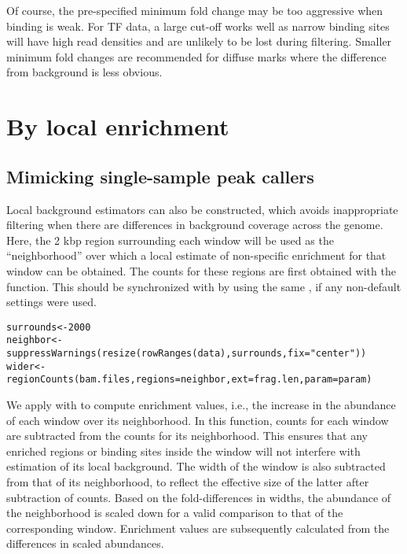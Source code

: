 \documentclass{report}\usepackage[]{graphicx}\usepackage[usenames,dvipsnames]{color}
\newcommand{\hlnum}[1]{\textcolor[rgb]{0.816,0.125,0.439}{#1}}%
\newcommand{\hlstr}[1]{\textcolor[rgb]{0.251,0.627,0.251}{#1}}%
\newcommand{\hlstd}[1]{\textcolor[rgb]{0.251,0.251,0.251}{#1}}%
\newcommand{\hlkwb}[1]{\textcolor[rgb]{0,0,0}{#1}}%
\newcommand{\hlkwc}[1]{\textcolor[rgb]{0.251,0.251,0.251}{#1}}%
\newcommand{\hlkwd}[1]{\textcolor[rgb]{0.878,0.439,0.125}{#1}}%
\newenvironment{knitrout}{}{} %
\begin{document}
Of course, the pre-specified minimum fold change may be too aggressive when binding is weak. 
For TF data, a large cut-off works well as narrow binding sites will have high read densities and are unlikely to be lost during filtering. 
Smaller minimum fold changes are recommended for diffuse marks where the difference from background is less obvious. 

\section{By local enrichment}

\subsection{Mimicking single-sample peak callers}
Local background estimators can also be constructed, which avoids inappropriate filtering when there are differences in background coverage across the genome. 
Here, the 2 kbp region surrounding each window will be used as the ``neighborhood'' over which a local estimate of non-specific enrichment for that window can be obtained. 
The counts for these regions are first obtained with the  function.
This should be synchronized with  by using the same , if any non-default settings were used.

\begin{knitrout}
\color{fgcolor}\begin{kframe}
\begin{alltt}
\hlstd{surrounds} \hlkwb{<-} \hlnum{2000}
\hlstd{neighbor} \hlkwb{<-} \hlkwd{suppressWarnings}\hlstd{(}\hlkwd{resize}\hlstd{(}\hlkwd{rowRanges}\hlstd{(data), surrounds,} \hlkwc{fix}\hlstd{=}\hlstr{"center"}\hlstd{))}
\hlstd{wider} \hlkwb{<-} \hlkwd{regionCounts}\hlstd{(bam.files,} \hlkwc{regions}\hlstd{=neighbor,} \hlkwc{ext}\hlstd{=frag.len,} \hlkwc{param}\hlstd{=param)}
\end{alltt}
\end{kframe}
\end{knitrout}

We apply  with  to compute enrichment values, i.e., the increase in the abundance of each window over its neighborhood.
In this function, counts for each window are subtracted from the counts for its neighborhood.
This ensures that any enriched regions or binding sites inside the window will not interfere with estimation of its local background.
The width of the window is also subtracted from that of its neighborhood, to reflect the effective size of the latter after subtraction of counts.
Based on the fold-differences in widths, the abundance of the neighborhood is scaled down for a valid comparison to that of the corresponding window.
Enrichment values are subsequently calculated from the differences in scaled abundances.
\end{document}
